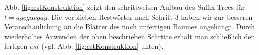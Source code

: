 \documentclass[12pt]{report}
\begin{document}
Abb. \ref{fig:cstKonstruktion} zeigt den schrittweisen Aufbau des Suffix Trees für $t = agcgacgag$. Die verblieben Restwörter nach Schritt 3 haben wir zur besseren Veranschaulichung an die Blätter des noch unfertigen Baumes angehängt. Durch wiederholtes Anwenden der oben beschrieben Schritte erhält man schließlich den fertigen $cst$ (vgl. Abb. \ref{fig:cstKonstruktion} unten).

\end{document}
